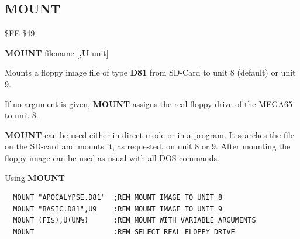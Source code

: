 
\newpage
\subsection{MOUNT}
\begin{description}[leftmargin=2cm,style=nextline]
\item [Token:] \$FE \$49
\item [Format:] {\bf MOUNT} filename [{\bf,U} unit]
\item [Usage:] Mounts a floppy image file of type {\bf D81}
   from SD-Card to unit 8 (default) or unit 9.

   If no argument is given, {\bf MOUNT} assigns the real floppy drive
   of the MEGA65 to unit 8.

   \filenamedefinition

   \unitdefinition

\item [Remarks:]
      {\bf MOUNT} can be used either in direct mode or in a program.
      It searches the file on the SD-card and mounts it, as requested,
      on unit 8 or 9. After mounting the floppy image can be used
      as usual with all DOS commands.

\item [Examples:] Using {\bf MOUNT}
\begin{tcolorbox}[colback=black,coltext=white]
\verbatimfont{\codefont}
\begin{verbatim}
  MOUNT "APOCALYPSE.D81"  ;REM MOUNT IMAGE TO UNIT 8
  MOUNT "BASIC.D81",U9    :REM MOUNT IMAGE TO UNIT 9
  MOUNT (FI$),U(UN%)      :REM MOUNT WITH VARIABLE ARGUMENTS
  MOUNT                   :REM SELECT REAL FLOPPY DRIVE
\end{verbatim}
\end{tcolorbox}
\end{description}


\newpage
